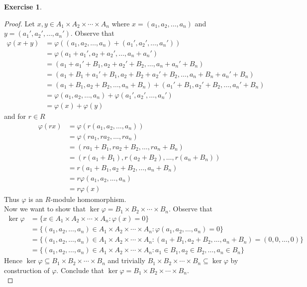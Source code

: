\documentclass[8pt]{amsart}
\theoremstyle{plain}%
\theoremstyle{definition}
\newtheorem*{exercise}{Exercise}%
\theoremstyle{remark}
\numberwithin{equation}{section}
\begin{document}
\begin{exercise}
\begin{proof}
		
		Let $x, y \in A_1 \times A_2 \times \cdots \times A_n$ where $x = (a_1, a_2, \ldots, a_n)$ and $y = (a_1', a_2', \ldots, a_n')$. Observe that
		\begin{align*}
			\varphi(x + y) &= \varphi((a_1, a_2, \ldots, a_n) + (a_1', a_2', \ldots, a_n'))\\
			&= \varphi(a_1 + a_1', a_2 + a_2', \ldots, a_n + a_n')\\
			&= (a_1 + a_1' + B_1, a_2 + a_2' + B_2, \ldots, a_n + a_n' + B_n)\\
			&= (a_1 + B_1 + a_1' + B_1, a_2 + B_2 + a_2' + B_2, \ldots, a_n + B_n + a_n' + B_n)\\
			&= (a_1 + B_1, a_2 + B_2, \ldots, a_n + B_n) + (a_1' + B_1, a_2' + B_2, \ldots, a_n' + B_n)\\
			&= \varphi(a_1, a_2, \ldots, a_n) + \varphi(a_1', a_2', \ldots, a_n')\\
			&= \varphi(x) + \varphi(y)
		\end{align*}
		and for $r \in R$
		\begin{align*}
			\varphi(rx) &= \varphi(r(a_1, a_2, \ldots, a_n))\\
			&= \varphi(ra_1, ra_2, \ldots, ra_n)\\
			&= (ra_1 + B_1, ra_2 + B_2, \ldots, ra_n + B_n)\\
			&= (r(a_1 + B_1), r(a_2 + B_2), \ldots, r(a_n + B_n))\\
			&= r(a_1 + B_1, a_2 + B_2, \ldots, a_n + B_n)\\
			&= r\varphi(a_1, a_2, \ldots, a_n)\\
			&= r\varphi(x)
		\end{align*}
		Thus $\varphi$ is an $R$-module homomorphism.\\

		Now we want to show that $\ker \varphi = B_1 \times B_2 \times \cdots \times B_n$. Observe that
		\begin{align*}
			\ker \varphi &= \{x \in A_1 \times A_2 \times \cdots \times A_n : \varphi(x)= 0\}\\
			&= \{(a_1, a_2, \ldots, a_n) \in A_1 \times A_2 \times \cdots \times A_n : \varphi(a_1, a_2, \ldots, a_n) = 0\}\\
			&= \{(a_1, a_2, \ldots, a_n) \in A_1 \times A_2 \times \cdots \times A_n : (a_1 + B_1, a_2 + B_2, \ldots, a_n + B_n) = (0, 0, \ldots, 0)\}\\
			&= \{(a_1, a_2, \ldots, a_n) \in A_1 \times A_2 \times \cdots \times A_n : a_1 \in B_1, a_2 \in B_2, \ldots, a_n \in B_n\}
		\end{align*}
		Hence $\ker\varphi \subseteq B_1 \times B_2 \times \cdots \times B_n$ and trivially $B_1 \times B_2 \times \cdots \times B_n \subseteq \ker \varphi$ by construction of $\varphi$. Conclude that $\ker \varphi = B_1 \times B_2 \times \cdots \times B_n$.\\


\end{proof}
\end{exercise}
\end{document}
